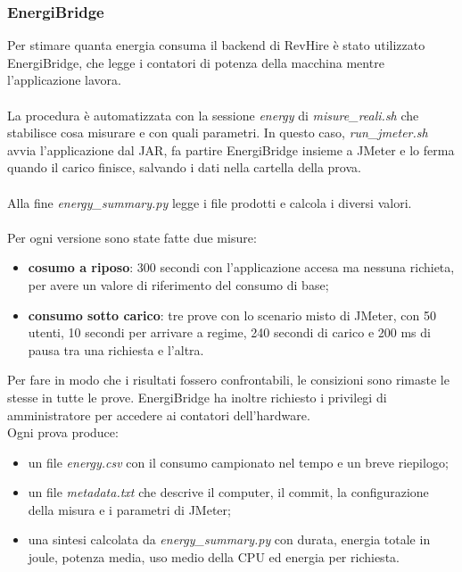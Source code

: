 \documentclass[12pt,a4paper]{article}
\begin{document}
    \subsubsection{EnergiBridge}
    Per stimare quanta energia consuma il backend di RevHire è stato utilizzato
    EnergiBridge, che legge i contatori di potenza della macchina mentre l'applicazione
    lavora. \\ \\
    La procedura è automatizzata con la sessione \textit{energy} di \textit{misure\_reali.sh}
    che stabilisce cosa misurare e con quali parametri. In questo caso, \textit{run\_jmeter.sh}
    avvia l'applicazione dal JAR, fa partire EnergiBridge insieme a JMeter e lo ferma quando il carico finisce,
    salvando i dati nella cartella della prova. \\ \\ Alla fine \textit{energy\_summary.py}
    legge i file prodotti e calcola i diversi valori. \\ \\
    Per ogni versione sono state fatte due misure:
    \begin{itemize}
        \item \textbf{cosumo a riposo}: 300 secondi con l'applicazione accesa ma nessuna
        richieta, per avere un valore di riferimento del consumo di base;
        \item \textbf{consumo sotto carico}: tre prove con lo scenario misto di JMeter,
        con 50 utenti, 10 secondi per arrivare a regime, 240 secondi di carico e 200 ms
        di pausa tra una richiesta e l'altra.
    \end{itemize}
    Per fare in modo che i risultati fossero confrontabili, le consizioni sono rimaste
    le stesse in tutte le prove. EnergiBridge ha inoltre richiesto i privilegi
    di amministratore per accedere ai contatori dell'hardware. \\
    Ogni prova produce:
    \begin{itemize}
        \item un file \textit{energy.csv} con il consumo campionato nel tempo e un breve
        riepilogo;
        \item un file \textit{metadata.txt} che descrive il computer, il commit, la configurazione
        della misura e i parametri di JMeter;
        \item una sintesi calcolata da \textit{energy\_summary.py} con durata, energia totale in joule,
        potenza media, uso medio della CPU ed energia per richiesta.
    \end{itemize}
\end{document}
